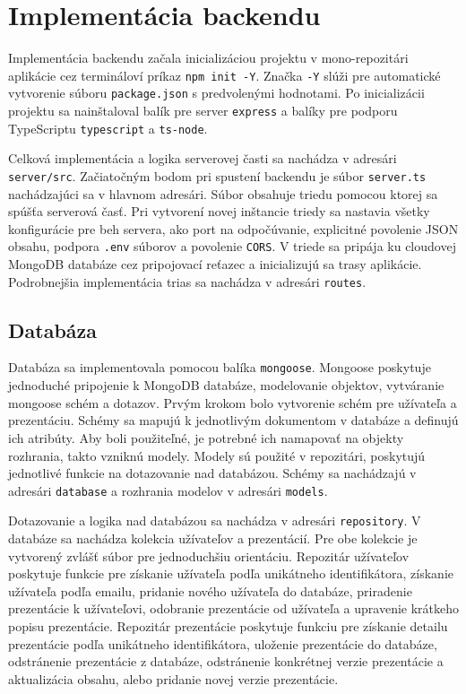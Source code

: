 \section{Implementácia backendu}
\label{impbackend}
Implementácia backendu začala inicializáciou projektu v mono-repozitári aplikácie cez termináloví príkaz \texttt{npm init -Y}. Značka \texttt{-Y} slúži pre automatické vytvorenie súboru \texttt{package.json} s predvolenými hodnotami. Po inicializácii projektu sa nainštaloval balík pre server \texttt{express} a balíky pre podporu TypeScriptu \texttt{typescript} a \texttt{ts-node}.

Celková implementácia a logika serverovej časti sa nachádza v adresári \texttt{server/src}. Začiatočným bodom pri spustení backendu je súbor \texttt{server.ts} nachádzajúci sa v hlavnom adresári. Súbor obsahuje triedu pomocou ktorej sa spúšťa serverová časť. Pri vytvorení novej inštancie triedy sa nastavia všetky konfigurácie pre beh servera, ako port na odpočúvanie, explicitné povolenie JSON obsahu, podpora \texttt{.env} súborov a povolenie \texttt{CORS}. V triede sa pripája ku cloudovej MongoDB databáze cez pripojovací reťazec a inicializujú sa trasy aplikácie. Podrobnejšia implementácia trias sa nachádza v adresári \texttt{routes}. 

\subsection{Databáza}
Databáza sa implementovala pomocou balíka \texttt{mongoose}. Mongoose poskytuje jednoduché pripojenie k MongoDB databáze, modelovanie objektov, vytváranie mongoose schém a dotazov. Prvým krokom bolo vytvorenie schém pre užívateľa a prezentáciu. Schémy sa mapujú k jednotlivým dokumentom v databáze a definujú ich atribúty. Aby boli použiteľné, je potrebné ich namapovať na objekty rozhrania, takto vzniknú modely. Modely sú použité v repozitári, poskytujú jednotlivé funkcie na dotazovanie nad databázou. Schémy sa nachádzajú v adresári \texttt{database} a rozhrania modelov v adresári \texttt{models}.

Dotazovanie a logika nad databázou sa nachádza v adresári \texttt{repository}. V databáze sa nachádza kolekcia užívateľov a prezentácií. Pre obe kolekcie je vytvorený zvlášť súbor pre jednoduchšiu orientáciu. Repozitár užívateľov poskytuje funkcie pre získanie užívateľa podľa unikátneho identifikátora, získanie užívateľa podľa emailu, pridanie nového užívateľa do databáze, priradenie prezentácie k užívateľovi, odobranie prezentácie od užívateľa a upravenie krátkeho popisu prezentácie. Repozitár prezentácie poskytuje funkciu pre získanie detailu prezentácie podľa unikátneho identifikátora, uloženie prezentácie do databáze, odstránenie prezentácie z databáze, odstránenie konkrétnej verzie prezentácie a aktualizácia obsahu, alebo pridanie novej verzie prezentácie.

